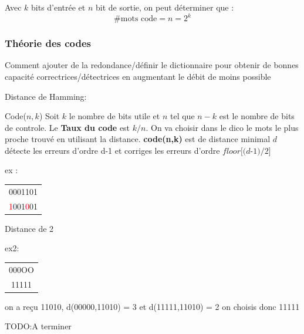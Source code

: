 			Avec $k$ bits d'entrée et $n$ bit de sortie, on peut déterminer que :
			\begin{equation}
				\# \text{mots code} = n = 2^k
			\end{equation}
			
		\subsubsection{Théorie des codes}
		
			Comment ajouter de la redondance/définir le dictionnaire pour obtenir de bonnes capacité correctrices/détectrices en augmentant le débit de moins possible
			
			Distance de Hamming:
			
			Code($n,k$) Soit $k$ le nombre de bits utile et $n$ tel que $n-k$ est le nombre de bits de controle. Le \textbf{Taux du code} est $k/n$. On va choisir dans le dico le mots le plus proche trouvé en utilisant la distance. \textbf{code(n,k)} est de distance minimal $d$ détecte les erreurs d'ordre d-1 et corriges les erreurs d'ordre $\textit{floor[(d-1)/2]}$
			
			ex : 
			\begin{tabular}{c}
			0001101\\
			\textcolor{red}{1}001\textcolor{red}{0}01
			\end{tabular}Distance de 2
			
			ex2:
			
			\begin{tabular}{c}
			000OO\\
			11111
			\end{tabular} on a reçu 11010, d(00000,11010) = 3 et d(11111,11010) = 2 on choisis donc 11111
			
			
			TODO:A terminer
